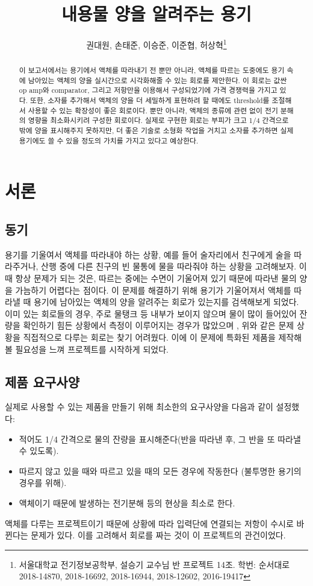 \documentclass[a4paper,itemph]{oblivoir}
\title{내용물 양을 알려주는 용기}
\author{권대원, 손태준, 이승준, 이준협, 허상혁\thanks{{서울대학교 전기정보공학부, 설승기 교수님 반 프로젝트 14조. \newline 학번: 순서대로 2018-14870, 2018-16692, 2018-16944, 2018-12602, 2016-19417}}}
\theoremstyle{definition}
\begin{document}
\maketitle

\begin{abstract}
이 보고서에서는 용기에서 액체를 따라내기 전 뿐만 아니라, 액체를 따르는 도중에도 용기 속에 남아있는 액체의 양을 실시간으로 시각화해줄 수 있는 회로를 제안한다. 이 회로는 값싼 op amp와 comparator, 그리고 저항만을 이용해서 구성되었기에 가격 경쟁력을 가지고 있다. 또한, 소자를 추가해서 액체의 양을 더 세밀하게 표현하려 할 때에도 threshold를 조절해서 사용할 수 있는 확장성이 좋은 회로이다. 뿐만 아니라, 액체의 종류에 관련 없이 전기 분해의 영향을 최소화시키려 구성한 회로이다. 실제로 구현한 회로는 부피가 크고 1/4 간격으로밖에 양을 표시해주지 못하지만, 더 좋은 기술로 소형화 작업을 거치고 소자를 추가하면 실제 용기에도 쓸 수 있을 정도의 가치를 가지고 있다고 예상한다.
\end{abstract}

\section{서론}
\subsection{동기}
용기를 기울여서 액체를 따라내야 하는 상황, 예를 들어 술자리에서 친구에게 술을 따라주거나, 산행 중에 다른 친구의 빈 물통에 물을 따라줘야 하는 상황을 고려해보자. 이 때 항상 문제가 되는 것은, 따르는 중에는 수면이 기울어져 있기 때문에 따라낸 물의 양을 가늠하기 어렵다는 점이다. 이 문제를 해결하기 위해 용기가 기울어져서 액체를 따라낼 때 용기에 남아있는 액체의 양을 알려주는 회로가 있는지를 검색해보게 되었다. 이미 있는 회로들의 경우, 주로 물탱크 등 내부가 보이지 않으며 물이 많이 들어있어 잔량을 확인하기 힘든 상황에서 측정이 이루어지는 경우가 많았으며 \cite{1}, 위와 같은 문제 상황을 직접적으로 다루는 회로는 찾기 어려웠다. 이에 이 문제에 특화된 제품을 제작해볼 필요성을 느껴 프로젝트를 시작하게 되었다. 

\subsection{제품 요구사양}
실제로 사용할 수 있는 제품을 만들기 위해 최소한의 요구사양을 다음과 같이 설정했다:
\begin{itemize}
    \item 적어도 1/4 간격으로 물의 잔량을 표시해준다(반을 따라낸 후, 그 반을 또 따라낼 수 있도록).
    \item 따르지 않고 있을 때와 따르고 있을 때의 모든 경우에 작동한다 (불투명한 용기의 경우를 위해).
    \item 액체이기 때문에 발생하는 전기분해 등의 현상을 최소로 한다.
\end{itemize}
액체를 다루는 프로젝트이기 때문에 상황에 따라 입력단에 연결되는 저항이 수시로 바뀐다는 문제가 있다. 이를 고려해서 회로를 짜는 것이 이 프로젝트의 관건이었다.
\end{document}
